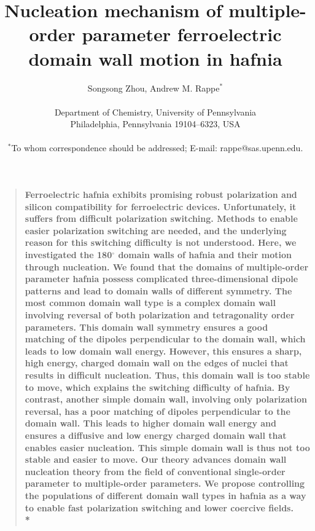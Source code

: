 \documentclass[12pt]{article}
\title{Nucleation mechanism of multiple-order parameter ferroelectric domain wall motion in hafnia}
\author
{Songsong Zhou, Andrew M. Rappe$^{\ast}$\\
\\
\normalsize{Department of Chemistry, University of Pennsylvania}\\
\normalsize{Philadelphia, Pennsylvania 19104--6323, USA}\\
\\
\normalsize{$^\ast$To whom correspondence should be addressed; E-mail:  rappe@sas.upenn.edu.}
}
\date{}
\newenvironment{sciabstract}{%
\begin{quote} \bf}
{\end{quote}}
\begin{document}
 


\baselineskip24pt


\maketitle 

\renewcommand{\figurename}{{\bf{Fig.}}}
\captionsetup{labelfont=bf}


\begin{sciabstract}
Ferroelectric hafnia exhibits promising robust polarization and silicon compatibility for ferroelectric devices. 
Unfortunately, it suffers from difficult polarization switching. Methods to enable easier polarization switching are needed, and the underlying reason for this switching difficulty is not understood. 
Here, we investigated the 180$^\circ$ domain walls of hafnia and their motion through nucleation.
We found that the domains of multiple-order parameter hafnia possess complicated three-dimensional dipole patterns and lead to domain walls of different symmetry.
The most common domain wall type is a complex domain wall involving reversal of both polarization and tetragonality order parameters. 
This domain wall symmetry ensures a good matching of the dipoles perpendicular to the domain wall, which leads to low domain wall energy. However, this ensures a sharp, high energy, charged domain wall on the edges of nuclei that results in difficult nucleation. 
Thus, this domain wall is too stable to move, which explains the switching difficulty of hafnia.
By contrast, another simple domain wall, involving only polarization reversal, has a poor matching of dipoles perpendicular to the domain wall. This leads to higher domain wall energy and ensures a diffusive and low energy charged domain wall that enables easier nucleation.
This simple domain wall is thus not too stable and easier to move.
Our theory advances domain wall nucleation theory from the field of conventional single-order parameter to multiple-order parameters. 
We propose controlling the populations of different domain wall types in hafnia as a way to enable fast polarization switching and lower coercive fields.
\\*
\end{sciabstract}
\end{document}
